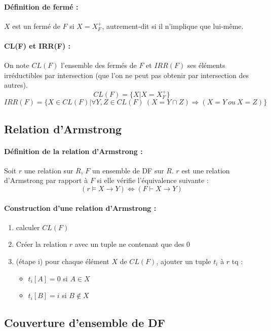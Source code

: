\documentclass[10pt,a4paper]{article}
\begin{document}
\paragraph{Définition de fermé :} $X$ est un fermé de $F$ si $X=X_{F}^{+}$, autrement-dit si il n'implique que lui-même.

\paragraph{CL(F) et IRR(F) :} On note $CL(F)$ l'ensemble des fermés de $F$ et $IRR(F)$ ses éléments irréductibles par intersection (que l'on ne peut pas obtenir par intersection des autres). 
$$CL(F) = \{X|X=X_{F}^{+}\}$$
$$IRR(F)=\{X \in CL(F) | \forall Y,Z \in CL(F) \ (X = Y \cap Z) \Rightarrow (X=Y \ ou \ X=Z)\}$$

\subsection{Relation d'Armstrong}

\paragraph{Définition de la relation d'Armstrong :} Soit $r$ une relation sur $R$, $F$ un ensemble de DF sur $R$. $r$ est une relation d'Armstrong par rapport à $F$ si elle vérifie l'équivalence suivante :
$$(r \models X \rightarrow Y) \Leftrightarrow (F \vdash X \rightarrow Y)$$

\paragraph{Construction d'une relation d'Armstrong :}
\begin{enumerate}
\item calculer $CL(F)$
\item Créer la relation $r$ avec un tuple ne contenant que des 0
\item (étape i) pour chaque élément $X$ de $CL(F)$, ajouter un tuple $t_{i}$ à $r$ tq :
\begin{itemize}
\item $t_{i}[A]=0$ si $A \in X$
\item $t_{i}[B]=i$ si $B \not\in X$
\end{itemize}
\end{enumerate}

\subsection{Couverture d'ensemble de DF}
\end{document}
